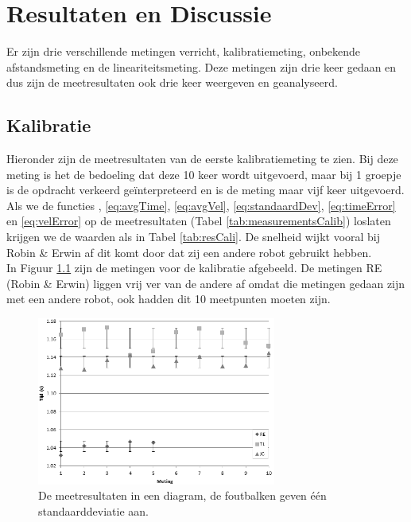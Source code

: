 \documentclass{report}
\begin{document}
\chapter{Resultaten en Discussie}
Er zijn drie verschillende metingen verricht, kalibratiemeting, onbekende afstandsmeting en de lineariteitsmeting. Deze metingen zijn drie keer gedaan en dus zijn de meetresultaten ook drie keer weergeven en geanalyseerd.
\section{Kalibratie}
Hieronder zijn de meetresultaten van de eerste kalibratiemeting te zien. Bij deze meting is het de bedoeling dat deze 10 keer wordt uitgevoerd, maar bij 1 groepje is de opdracht verkeerd ge\"interpreteerd en is de meting maar vijf keer uitgevoerd.\\

Als we de functies \label{eq:vel}, \ref{eq:avgTime},  \ref{eq:avgVel},  \ref{eq:standaardDev},  \ref{eq:timeError} en  \ref{eq:velError} op de meetresultaten (Tabel \ref{tab:measurementsCalib}) loslaten krijgen we de waarden als in Tabel \ref{tab:resCali}. De snelheid wijkt vooral bij Robin \& Erwin af dit komt door dat zij een andere robot gebruikt hebben.\\

In Figuur \ref{fig:measureGraph} zijn de metingen voor de kalibratie afgebeeld. De metingen RE (Robin \& Erwin) liggen vrij ver van de andere af omdat die metingen gedaan zijn met een andere robot, ook hadden dit 10 meetpunten moeten zijn.

\begin{figure}[H]
	\centering
	\includegraphics[width=0.7\textwidth]{kalibratie}
	\caption{De meetresultaten in een diagram, de foutbalken geven één standaarddeviatie aan.}
	\label{fig:measureGraph}
\end{figure}
\end{document}
